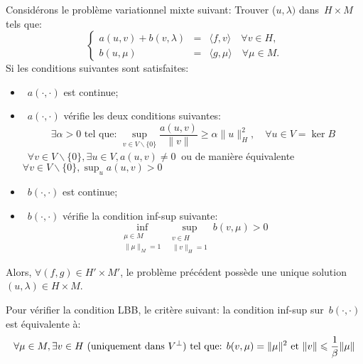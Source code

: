\medskip
\begin{theoreme}
Considérons le problème variationnel mixte suivant:
Trouver ($u, \lambda)$ dans~$H\times M$ tels que:
 \begin{equation}\left\{
\begin{array}{rcl}
 a(u,v) + b(v, \lambda) &=& \langle f,v\rangle \quad \forall v\in H,\\
b(u,\mu) &=& \langle g,\mu\rangle \quad \forall \mu \in M.
\end{array}\right.
\end{equation}
Si les conditions suivantes sont satisfaites:
\begin{itemize}
  \item~$a(\cdot,\cdot)$ est continue;
  \item~$a(\cdot,\cdot)$ vérifie les deux conditions suivantes:
  \begin{equation}\exists \alpha> 0 \text{ tel que: } \sup_{v\in V\backslash\{0\}} \frac{a(u,v)}{\|v\|} \ge\alpha\|u\|_H^2, \quad \forall u\in V=\ker B\end{equation}
 ~$\forall v\in V\backslash\{0\}, \exists u\in V, a(u,v)\ne 0~$ ou de manière équivalente
~$\displaystyle\forall v\in V\backslash\{0\}, \sup_u a(u,v)> 0~$
  \item~$b(\cdot,\cdot)$ est continue;
  \item~$b(\cdot,\cdot)$ vérifie la condition inf-sup suivante:
\begin{equation}\inf_{\substack{\mu\in M\\\|\mu\|_M=1}} \sup_{\substack{v\in H\\\|v\|_H=1}} b(v,\mu) > 0\end{equation}
\end{itemize}
Alors, $\forall (f,g)\in H'\times M'$, le problème précédent possède une unique solution
$(u,\lambda) \in H\times M$.
\end{theoreme}
\medskipvm
Pour vérifier la condition LBB,  le critère suivant:
la condition inf-sup sur~$b(\cdot,\cdot)$ est équivalente à:
\begin{equation}\colorred
\forall\mu\in M, \exists v\in H \text{ (uniquement dans } V^\bot\text{) tel que: }
b(v,\mu)=\|\mu\|^2 \text{ et } \|v\|\le \dfrac1\beta \|\mu\|
\end{equation}









